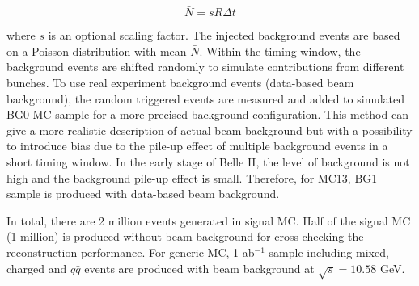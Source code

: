 \begin{equation}\label{bkgn}
	\bar{N} = sR\Delta t
\end{equation}

where $s$ is an optional scaling factor. The injected background events are based on a Poisson distribution with mean $\bar{N}$. Within the timing window, the background events are shifted randomly to simulate contributions from different bunches. To use real experiment background events (data-based beam background), the random triggered events are measured and added to
simulated BG0 MC sample for a more precised background configuration. This method can give a more realistic description of actual beam background but with a possibility to introduce bias due to the pile-up effect of multiple background events in a short timing window. In the early stage of Belle II, the level of background is not high and the background pile-up effect is small. Therefore, for MC13, BG1 sample is produced with data-based beam background.

In total, there are 2 million events generated in signal MC. Half of the signal MC (1 million) is produced without beam background for cross-checking the reconstruction performance. For generic MC, 1 ab$^{-1}$ sample including mixed, charged and $q\bar{q}$ events are produced with beam background at  $\sqrt{s} = 10.58 $ GeV.

